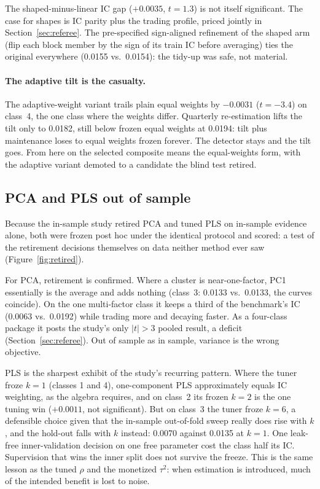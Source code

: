 \documentclass[11pt]{article}
\begin{document}
\noindent The shaped-minus-linear IC gap ($+0.0035$, $t=1.3$) is not itself significant.
The case for shapes is IC parity plus the trading profile, priced jointly in
Section~\ref{sec:referee}. The pre-specified sign-aligned refinement of the shaped arm
(flip each block member by the sign of its train IC before averaging) ties the original
everywhere (0.0155 vs.\ 0.0154): the tidy-up was safe, not material.

\paragraph{The adaptive tilt is the casualty.} The adaptive-weight variant trails plain
equal weights by $-0.0031$ ($t=-3.4$) on class~4, the one class where the weights differ.
Quarterly re-estimation lifts the tilt only to 0.0182, still below frozen equal weights
at 0.0194: tilt plus maintenance loses to equal weights frozen forever. The detector
stays and the tilt goes. From here on the selected composite means the equal-weights
form, with the adaptive variant demoted to a candidate the blind test retired.

\subsection{PCA and PLS out of sample}
\label{sec:holdout-retired}

Because the in-sample study retired PCA and tuned PLS on in-sample evidence alone, both
were frozen post hoc under the identical protocol and scored: a test of the retirement
decisions themselves on data neither method ever saw (Figure~\ref{fig:retired}).

For PCA, retirement is confirmed. Where a cluster is near-one-factor, PC1 essentially is
the average and adds nothing (class~3: 0.0133 vs.\ 0.0133, the curves coincide). On the
one multi-factor class it keeps a third of the benchmark's IC (0.0063 vs.\ 0.0192) while
trading more and decaying faster. As a four-class package it posts the study's only
$|t|>3$ pooled result, a deficit (Section~\ref{sec:referee}). Out of sample as in
sample, variance is the wrong objective.

PLS is the sharpest exhibit of the study's recurring pattern. Where the tuner froze
$k=1$ (classes 1 and 4), one-component PLS approximately equals IC weighting, as the
algebra requires, and on class~2 its frozen $k=2$ is the one tuning win ($+0.0011$, not
significant). But on class~3 the tuner froze $k=6$, a defensible choice given that the
in-sample out-of-fold sweep really does rise with $k$, and the hold-out falls with $k$
instead: 0.0070 against 0.0135 at $k=1$. One leak-free inner-validation decision on one
free parameter cost the class half its IC. Supervision that wins the inner split does not
survive the freeze. This is the same lesson as the tuned $\rho$ and the monetized
$\tau^2$: when estimation is introduced, much of the intended benefit is lost to noise.
\end{document}
